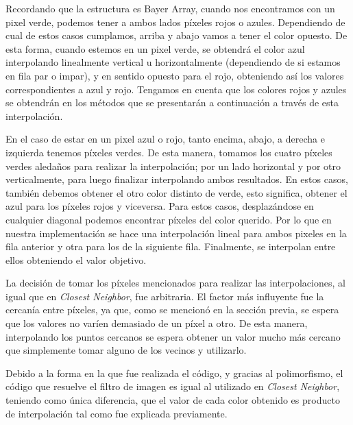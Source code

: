 Recordando que la estructura es Bayer Array, cuando nos encontramos con un pixel verde, podemos tener a ambos lados píxeles rojos o azules. Dependiendo de cual de estos casos cumplamos, arriba y abajo vamos a tener el color opuesto. De esta forma, cuando estemos en un pixel verde, se obtendrá el color azul interpolando linealmente vertical u horizontalmente (dependiendo de si estamos en fila par o impar), y en sentido opuesto para el rojo, obteniendo así los valores correspondientes a azul y rojo. Tengamos en cuenta que los colores rojos y azules se obtendrán en los métodos que se presentarán a continuación a través de esta interpolación.

\vspace{\baselineskip}

En el caso de estar en un pixel azul o rojo, tanto encima, abajo, a derecha e izquierda tenemos píxeles verdes. De esta manera, tomamos los cuatro píxeles verdes aledaños para realizar la interpolación; por un lado horizontal y por otro verticalmente, para luego finalizar interpolando ambos resultados. En estos casos, también debemos obtener el otro color distinto de verde, esto significa, obtener el azul para los píxeles rojos y viceversa. Para estos casos, desplazándose en cualquier diagonal podemos encontrar píxeles del color querido. Por lo que en nuestra implementación se hace una interpolación lineal para ambos pixeles en la fila anterior y otra para los de la siguiente fila. Finalmente, se interpolan entre ellos obteniendo el valor objetivo.

\vspace{\baselineskip}

La decisión de tomar los píxeles mencionados para realizar las interpolaciones, al igual que en \textit{Closest Neighbor}, fue arbitraria. El factor más influyente fue la cercanía entre píxeles, ya que, como se mencionó en la sección previa, se espera que los valores no varíen demasiado de un píxel a otro. De esta manera, interpolando los puntos cercanos se espera obtener un valor mucho más cercano que simplemente tomar alguno de los vecinos y utilizarlo.

\vspace{\baselineskip}

Debido a la forma en la que fue realizada el código, y gracias al polimorfismo, el código que resuelve el filtro de imagen es igual al utilizado en \textit{Closest Neighbor}, teniendo como única diferencia, que el valor de cada color obtenido es producto de interpolación tal como fue explicada previamente.

